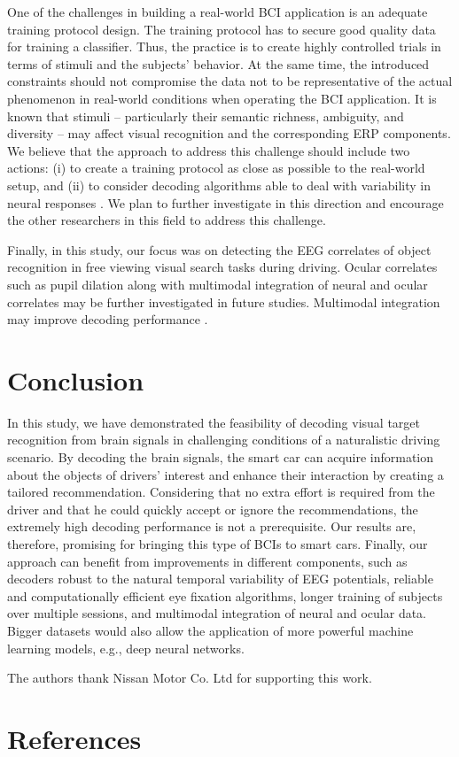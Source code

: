 \documentclass[12pt]{iopart}
\begin{document}
One of the challenges in building a real-world BCI application is an adequate
training protocol design. The training protocol has to secure good quality data
for training a classifier. Thus, the practice is to create highly controlled
trials in terms of stimuli and the subjects’ behavior.
At the same time, the introduced constraints should not 
compromise the data not to be representative of the actual 
phenomenon in real-world conditions when operating 
the BCI application. It is known that stimuli -- particularly
their semantic richness, ambiguity, and diversity -- may
affect visual recognition and the corresponding ERP
components. We believe that the approach to address
this challenge should include two actions: (i) to create a
training protocol as close as possible to the real-world
setup, and (ii) to consider decoding algorithms able
to deal with variability in neural responses
\cite{aydarkhanov_spatial_2020}. We plan to further investigate
in this direction and encourage the other researchers
in this field to address this challenge.



Finally, in this study, our focus was on detecting the EEG correlates of object recognition in free viewing visual search tasks during driving. Ocular correlates such as pupil dilation along with multimodal
integration of neural and ocular correlates may be further investigated
in future studies.
Multimodal integration may improve decoding performance \cite{jangraw_neurally_2014}.


\section{Conclusion}
\label{sec:conclusion}

In this study, we have demonstrated the feasibility of decoding
visual target recognition from brain signals in 
challenging conditions of a naturalistic driving scenario. 
By decoding the brain signals, the smart car can acquire information about
the objects of drivers’ interest and enhance their interaction by
creating a tailored recommendation.
Considering that no extra effort is required from
the driver and that he could quickly accept or ignore
the recommendations, the extremely high decoding performance
is not a prerequisite. Our results are, therefore,
promising for bringing this type of BCIs to smart cars.
Finally, our approach can benefit from improvements in
different components, such as decoders robust to the natural
temporal variability of EEG potentials, reliable and
computationally efficient eye fixation algorithms,
longer training of subjects over multiple sessions,
and multimodal integration of neural and ocular data.
Bigger datasets would also allow the application
of more powerful machine learning models,
e.g., deep neural networks.


\ack

The authors thank Nissan Motor Co. Ltd for supporting
this work.

\section*{References}



\end{document}
